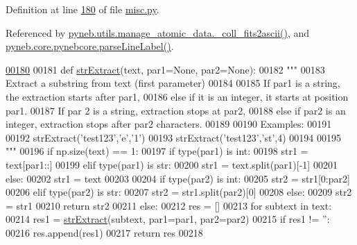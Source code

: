 Definition at line \hyperlink{misc_8py_source_l00180}{180} of file \hyperlink{misc_8py_source}{misc.\-py}.



Referenced by \hyperlink{manage__atomic__data_8py_source_l00671}{pyneb.\-utils.\-manage\-\_\-atomic\-\_\-data.\-\_\-coll\-\_\-fits2ascii()}, and \hyperlink{pynebcore_8py_source_l03289}{pyneb.\-core.\-pynebcore.\-parse\-Line\-Label()}.


\begin{DoxyCode}
\hypertarget{namespacepyneb_1_1utils_1_1misc_l00180}{}\hyperlink{namespacepyneb_1_1utils_1_1misc_aaf9c5249e3c3104e38854ca30f9df4b7}{00180} 
00181 \textcolor{keyword}{def }\hyperlink{namespacepyneb_1_1utils_1_1misc_aaf9c5249e3c3104e38854ca30f9df4b7}{strExtract}(text, par1=None, par2=None): 
00182     \textcolor{stringliteral}{"""}
00183 \textcolor{stringliteral}{    Extract a substring from text (first parameter)}
00184 \textcolor{stringliteral}{     }
00185 \textcolor{stringliteral}{    If par1 is a string, the extraction starts after par1,}
00186 \textcolor{stringliteral}{    else if it is an integer, it starts at position par1.}
00187 \textcolor{stringliteral}{    If par 2 is a string, extraction stops at par2, }
00188 \textcolor{stringliteral}{    else if par2 is an integer, extraction stops after par2 characters.}
00189 \textcolor{stringliteral}{    }
00190 \textcolor{stringliteral}{    Examples: }
00191 \textcolor{stringliteral}{    }
00192 \textcolor{stringliteral}{    strExtract('test123','e','1')}
00193 \textcolor{stringliteral}{    strExtract('test123','st',4)}
00194 \textcolor{stringliteral}{    }
00195 \textcolor{stringliteral}{    """}
00196     \textcolor{keywordflow}{if} np.size(text) == 1:
00197         \textcolor{keywordflow}{if} type(par1) \textcolor{keywordflow}{is} int:
00198             str1 = text[par1::]
00199         \textcolor{keywordflow}{elif} type(par1) \textcolor{keywordflow}{is} str:
00200             str1 = text.split(par1)[-1]
00201         \textcolor{keywordflow}{else}:
00202             str1 = text
00203     
00204         \textcolor{keywordflow}{if} type(par2) \textcolor{keywordflow}{is} int:
00205             str2 = str1[0:par2]
00206         \textcolor{keywordflow}{elif} type(par2) \textcolor{keywordflow}{is} str:
00207             str2 = str1.split(par2)[0]
00208         \textcolor{keywordflow}{else}:
00209             str2 = str1
00210         \textcolor{keywordflow}{return} str2
00211     \textcolor{keywordflow}{else}:
00212         res = []
00213         \textcolor{keywordflow}{for} subtext \textcolor{keywordflow}{in} text:
00214             res1 = \hyperlink{namespacepyneb_1_1utils_1_1misc_aaf9c5249e3c3104e38854ca30f9df4b7}{strExtract}(subtext, par1=par1, par2=par2)
00215             \textcolor{keywordflow}{if} res1 != \textcolor{stringliteral}{''}:
00216                 res.append(res1)
00217         \textcolor{keywordflow}{return} res
00218 

\end{DoxyCode}


